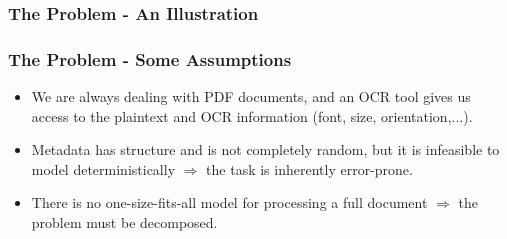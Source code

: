 \documentclass{beamer}
\begin{document}
\begin{frame}
\frametitle{The Problem - An Illustration}
\begin{figure}[!t]
\center
{}
{}
\end{figure}
\end{frame}


\begin{frame}
\frametitle{The Problem - Some Assumptions}
\begin{itemize}
\item We are always dealing with PDF documents, and an OCR tool gives us access to the plaintext and OCR information (font, size, orientation,...).
\item Metadata has structure and is not completely random, but it is infeasible to model deterministically $\Rightarrow$ the task is inherently error-prone.
\item There is no one-size-fits-all model for processing a full document $\Rightarrow$ the problem must be decomposed.
\end{itemize}
\end{frame}
\end{document}
